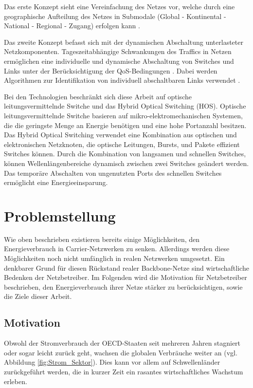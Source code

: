 \documentclass[12pt,titlepage]{article}
\begin{document}
Das erste Konzept sieht eine Vereinfachung des Netzes vor, welche durch eine geographische Aufteilung des Netzes in Submodale (Global - Kontinental - National - Regional - Zugang) erfolgen kann \cite{aleksic2014}.

Das zweite Konzept befasst sich mit der dynamischen Abschaltung unterlasteter Netzkomponenten. Tageszeitabhängige Schwankungen des Traffics in Netzen ermöglichen eine individuelle und dynamische Abschaltung von Switches und Links unter der Be\-rück\-sich\-ti\-gung der QoS-Bedingungen \cite{aleksic2013}. Dabei werden Algorithmen zur Identifikation von individuell abschaltbaren Links verwendet \cite{fisher}.

Bei den Technologien beschränkt sich diese Arbeit auf optische leitungsvermittelnde Switche und das Hybrid Optical Switching (HOS). Optische leitungsvermittelnde Switche basieren auf mikro-elektromechanischen Systemen, die die geringste Menge an Energie benötigen und eine hohe Portanzahl besitzen. Das Hybrid Optical Switching verwendet eine Kombination aus optischen und elektronischen Netzknoten, die optische Leitungen, Bursts, und Pakete effizient Switches können. Durch die Kombination von langsamen und schnellen Switches, können Wellenlängenbereiche dynamisch zwischen zwei Switches geändert werden. Das temporäre Abschalten von ungenutzten Ports des schnellen Switches ermöglicht eine Energieeinsparung.  \cite{aleksic2013}

\section{Problemstellung}
Wie oben beschrieben existieren bereits einige Möglichkeiten, den Energieverbrauch in Carrier-Netzwerken zu senken. Allerdings werden diese Möglichkeiten noch nicht umfänglich in realen Netzwerken umgesetzt. Ein denkbarer Grund für diesen Rückstand realer Backbone-Netze sind wirtschaftliche Bedenken der Netzbetreiber. Im Folgenden wird die Motivation für Netzbetreiber beschrieben, den Energieverbrauch ihrer Netze stärker zu berücksichtigen, sowie die Ziele dieser Arbeit.

\subsection{Motivation}
Obwohl der Stromverbrauch der OECD-Staaten seit mehreren Jahren stagniert oder sogar leicht zurück geht, wachsen die globalen Verbräuche weiter an (vgl. Abbildung \ref{fig:Strom_Sektor}). Dies kann vor allem auf  Schwellenländer zurückgeführt werden, die in kurzer Zeit ein rasantes wirtschaftliches Wachstum erleben.
\end{document}
